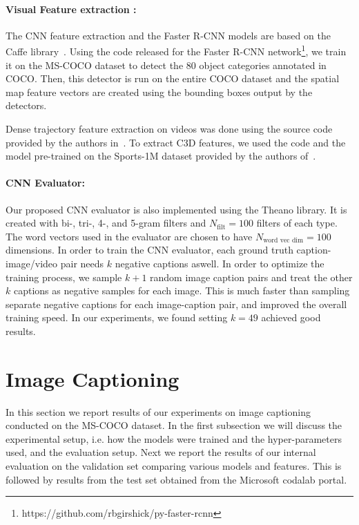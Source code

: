 \paragraph*{Visual Feature extraction : }%
The CNN feature extraction and the Faster R-CNN models are based on the Caffe
library~\cite{jia2014caffe}.
Using the code released for the Faster R-CNN
network\footnote{https://github.com/rbgirshick/py-faster-rcnn}, we train it on
the MS-COCO dataset to detect the 80 object categories annotated in COCO.
Then, this detector is run on the entire COCO dataset and the spatial map feature
vectors are created using the bounding boxes output by the detectors.

Dense trajectory feature extraction on videos was done using the source code
provided by the authors in~\cite{DBLP:conf/cvpr/WangKSL11}.
To extract C3D features, we used the code and the model pre-trained on the
Sports-1M dataset provided by the authors of~\cite{DBLP:C3D}.

\paragraph*{CNN Evaluator:} Our proposed CNN evaluator is also implemented using
the Theano library. 
It is created with bi-, tri-, 4-, and 5-gram filters and $N_{\text{filt}}=100$
filters of each type.
The word vectors used in the evaluator are chosen to have $N_{\text{word vec
dim}}=100$ dimensions.
In order to train the CNN evaluator, each ground truth caption-image/video pair
needs $k$ negative captions aswell.
In order to optimize the training process, we sample $k+1$ random image caption
pairs and treat the other $k$ captions as negative samples for each image.
This is much faster than sampling separate negative captions for each
image-caption pair, and improved the overall training speed.
In our experiments, we found setting $k=49$ achieved good results.


\section{Image Captioning}

In this section we report results of our experiments on image captioning
conducted on the MS-COCO dataset.
In the first subsection we will discuss the experimental setup, i.e. how the
models were trained and the hyper-parameters used, and the evaluation setup.
Next we report the results of our internal evaluation on the validation set
comparing various models and features.
This is followed by results from the test set obtained from the Microsoft
codalab portal.

